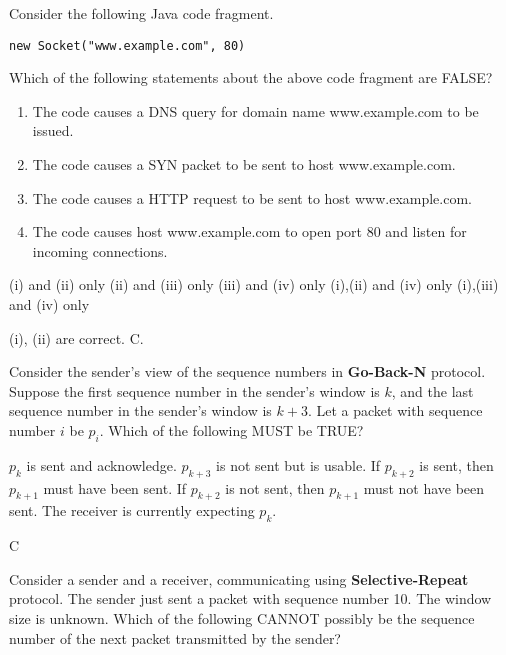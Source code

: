 \documentclass[a4paper,11pt,answers]{exam}
\begin{document}
\begin{questions}
\question
Consider the following Java code fragment.
\begin{verbatim}
new Socket("www.example.com", 80)
\end{verbatim}
Which of the following statements about the above code fragment are FALSE?
\renewcommand{\labelenumi}{(\roman{enumi})}
\begin{enumerate}
\item The code causes a DNS query for domain name www.example.com to be issued.
\item The code causes a SYN packet to be sent to host www.example.com.
\item The code causes a HTTP request to be sent to host www.example.com.
\item The code causes host www.example.com to open port 80 and listen for      
incoming connections.
\end{enumerate}

\begin{choices}
\choice (i) and (ii) only
\choice (ii) and (iii) only
\choice (iii) and (iv) only
\choice (i),(ii) and (iv) only
\choice (i),(iii) and (iv) only      
\end{choices}

\begin{solution}
(i), (ii) are correct.  C.
\end{solution}

\question
Consider the sender's view of the sequence numbers in \textbf{Go-Back-N}         protocol.
Suppose the first sequence number in the sender's window is $k$, and the last
sequence number in the sender's window is $k+3$.  Let a packet with sequence
number $i$ be $p_i$.  Which of the following MUST be TRUE?
\begin{choices}
\choice $p_k$ is sent and acknowledge.
\choice $p_{k+3}$ is not sent but is usable.
\choice If $p_{k+2}$ is sent, then $p_{k+1}$ must have been sent.
\choice If $p_{k+2}$ is not sent, then $p_{k+1}$ must not have been sent.
\choice The receiver is currently expecting $p_k$.
\end{choices}

\begin{solution}
C
\end{solution}

\question
Consider a sender and a receiver, communicating using \textbf{Selective-Repeat}
protocol.  The sender just sent a packet with sequence number 10.  The window
size is unknown.  Which of the following CANNOT possibly be the sequence number
of the next packet transmitted by the sender?
\begin{choices}
\end{choices}


\end{questions}
\end{document}
